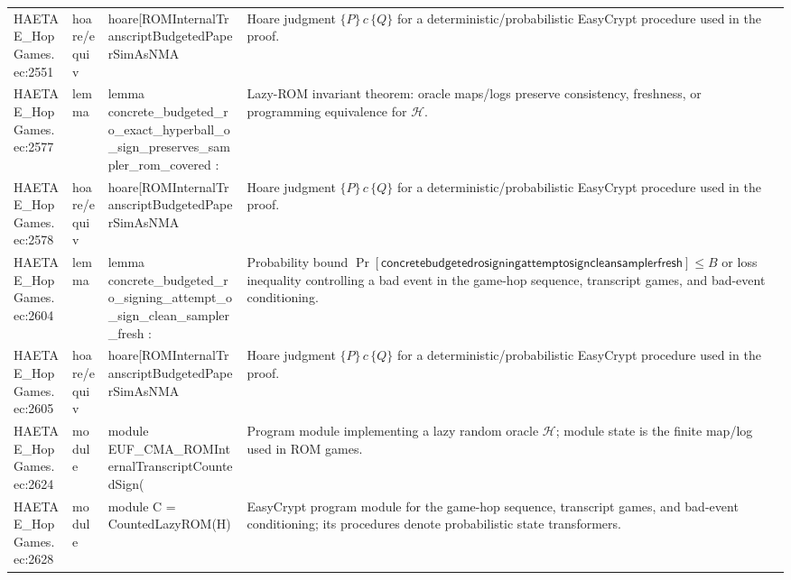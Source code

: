 \documentclass[10pt]{article}
\begin{document}
\begin{longtable}{L{0.11\textwidth}L{0.055\textwidth}L{0.385\textwidth}L{0.41\textwidth}}
HAETAE\_\allowbreak{}HopGames.\allowbreak{}ec:\allowbreak{}2551 & hoare/equiv & {\ttfamily\scriptsize hoare[ROMInternalTranscriptBudgetedPaperSimAsNMA} & Hoare judgment $\{P\}\,c\,\{Q\}$ for a deterministic/probabilistic EasyCrypt procedure used in the proof. \\
HAETAE\_\allowbreak{}HopGames.\allowbreak{}ec:\allowbreak{}2577 & lemma & {\ttfamily\scriptsize lemma concrete\_\allowbreak{}budgeted\_\allowbreak{}ro\_\allowbreak{}exact\_\allowbreak{}hyperball\_\allowbreak{}o\_\allowbreak{}sign\_\allowbreak{}preserves\_\allowbreak{}sampler\_\allowbreak{}rom\_\allowbreak{}covered :} & Lazy-ROM invariant theorem: oracle maps/logs preserve consistency, freshness, or programming equivalence for $\mathcal H$. \\
HAETAE\_\allowbreak{}HopGames.\allowbreak{}ec:\allowbreak{}2578 & hoare/equiv & {\ttfamily\scriptsize hoare[ROMInternalTranscriptBudgetedPaperSimAsNMA} & Hoare judgment $\{P\}\,c\,\{Q\}$ for a deterministic/probabilistic EasyCrypt procedure used in the proof. \\
HAETAE\_\allowbreak{}HopGames.\allowbreak{}ec:\allowbreak{}2604 & lemma & {\ttfamily\scriptsize lemma concrete\_\allowbreak{}budgeted\_\allowbreak{}ro\_\allowbreak{}signing\_\allowbreak{}attempt\_\allowbreak{}o\_\allowbreak{}sign\_\allowbreak{}clean\_\allowbreak{}sampler\_\allowbreak{}fresh :} & Probability bound $\Pr[\mathsf{concretebudgetedrosigningattemptosigncleansamplerfresh}]\le B$ or loss inequality controlling a bad event in the game-hop sequence, transcript games, and bad-event conditioning. \\
HAETAE\_\allowbreak{}HopGames.\allowbreak{}ec:\allowbreak{}2605 & hoare/equiv & {\ttfamily\scriptsize hoare[ROMInternalTranscriptBudgetedPaperSimAsNMA} & Hoare judgment $\{P\}\,c\,\{Q\}$ for a deterministic/probabilistic EasyCrypt procedure used in the proof. \\
HAETAE\_\allowbreak{}HopGames.\allowbreak{}ec:\allowbreak{}2624 & module & {\ttfamily\scriptsize module EUF\_\allowbreak{}CMA\_\allowbreak{}ROMInternalTranscriptCountedSign(} & Program module implementing a lazy random oracle $\mathcal H$; module state is the finite map/log used in ROM games. \\
HAETAE\_\allowbreak{}HopGames.\allowbreak{}ec:\allowbreak{}2628 & module & {\ttfamily\scriptsize module C = CountedLazyROM(H)} & EasyCrypt program module for the game-hop sequence, transcript games, and bad-event conditioning; its procedures denote probabilistic state transformers. \\

\end{longtable}
\end{document}
